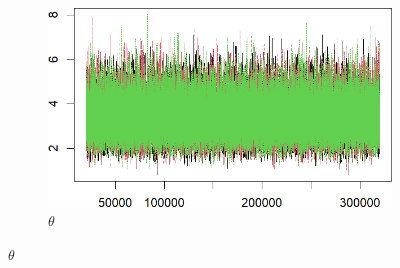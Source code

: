 \documentclass{Class/julia}
\begin{document}
\begin{figure}[!ht]
    \begin{subfigure}{0.45\textwidth}
        \centering
        \includegraphics[width=\textwidth]{rytgaard1990/trace_after_thinning_theta.png}
        \caption{\( \theta \)}
    \end{subfigure}
\end{figure}
\end{document}

